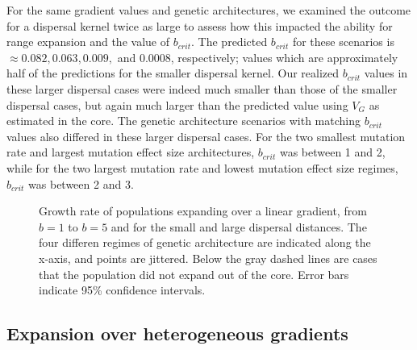 For the same gradient values and genetic architectures, we examined the outcome for a dispersal kernel twice as large to assess how this impacted the ability for range expansion and the value of $b_{crit}$. The predicted $b_{crit}$ for these scenarios is $\approx 0.082, 0.063, 0.009,$ and $0.0008$, respectively; values which are approximately half of the predictions for the smaller dispersal kernel. Our realized $b_{crit}$ values in these larger dispersal cases were indeed much smaller than those of the smaller dispersal cases, but again much larger than the predicted value using $V_G$ as estimated in the core. The genetic architecture scenarios with matching $b_{crit}$ values also differed in these larger dispersal cases. For the two smallest mutation rate and largest mutation effect size architectures, $b_{crit}$ was between 1 and 2, while for the two largest mutation rate and lowest mutation effect size regimes, $b_{crit}$ was between 2 and 3.







\begin{figure}[h]
\centering
{}
\caption[Growth rate of populations expanding over a linear gradient.]{Growth rate of populations expanding over a linear gradient, from $b = 1$ to $b = 5$ and for the small and large dispersal distances. The four differen regimes of genetic architecture are indicated along the x-axis, and points are jittered. Below the gray dashed lines are cases that the population did not expand out of the core. Error bars indicate 95\% confidence intervals.}
\label{fig:linearspeed}
\end{figure}



\subsection{Expansion over heterogeneous gradients}


